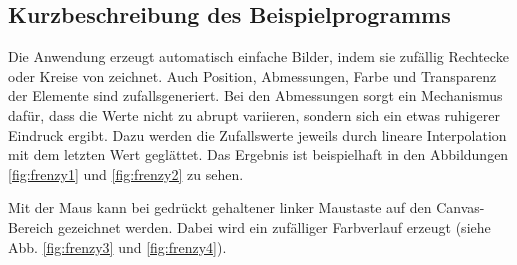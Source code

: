 \documentclass[a4paper, 12pt, hidelinks, listof=totoc, listoftables=totoc, bibliography=totoc]{scrreprt}
\begin{document}
\subsection{Kurzbeschreibung des Beispielprogramms}

Die Anwendung erzeugt automatisch einfache Bilder, indem sie zufällig Rechtecke oder Kreise von zeichnet. Auch Position, Abmessungen, Farbe und Transparenz der Elemente sind zufallsgeneriert. Bei den Abmessungen sorgt ein Mechanismus dafür, dass die Werte nicht zu abrupt variieren, sondern sich ein etwas ruhigerer Eindruck ergibt. Dazu werden die Zufallswerte jeweils durch lineare Interpolation mit dem letzten Wert geglättet. Das Ergebnis ist beispielhaft in den Abbildungen \ref{fig:frenzy1} und \ref{fig:frenzy2} zu sehen.

Mit der Maus kann bei gedrückt gehaltener linker Maustaste auf den Canvas-Bereich gezeichnet werden. Dabei wird ein zufälliger Farbverlauf erzeugt (siehe Abb. \ref{fig:frenzy3} und \ref{fig:frenzy4}).
\end{document}
